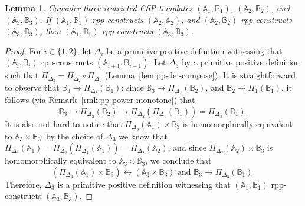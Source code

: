 \documentclass{article}
\newtheorem{lemma}[theorem]{Lemma}
\theoremstyle{definition}
\theoremstyle{remark}
\newcommand{\bA}{{\mathbb A}}
\newcommand{\bB}{{\mathbb B}}
\begin{document}
\begin{lemma}\label{lem:rpp-compose}
    Consider three restricted CSP templates $(\bA_1,\bB_1)$, $(\bA_2,\bB_2)$, 
    and $(\bA_3,\bB_3)$. If $(\bA_1,\bB_1)$ rpp-constructs $(\bA_2,\bA_2)$, 
    and $(\bA_2,\bB_2)$ rpp-constructs $(\bA_3,\bB_3)$, then $(\bA_1,\bB_1)$ 
    rpp-constructs $(\bA_3,\bB_3)$. 
\end{lemma}
\begin{proof}
    For $i\in\{1,2\}$, let $\Delta_i$ be a primitive positive definition witnessing that
    $(\bA_i,\bB_i)$ rpp-constructs $(\bA_{i+1},\bB_{i+1})$. Let $\Delta_3$ by a primitive
    positive definition such that $\Pi_{\Delta_3}=\Pi_{\Delta_2}\circ \Pi_{\Delta_1}$
    (Lemma~\ref{lem:pp-def-compose}). It is straightforward to observe that
    $\bB_3\to \Pi_{\Delta_3}(\bB_1)$:
    since  $\bB_3\to \Pi_{\Delta_2}(\bB_2)$, and $\bB_2\to \Pi_1(\bB_1)$, it follows (via
    Remark~\ref{rmk:pp-power-monotone}) that
    \[
        \bB_3\to \Pi_{\Delta_2}(\bB_2) \to \Pi_{\Delta_2}(\Pi_{\Delta_1}(\bB_1)) = \Pi_{\Delta_3}(\bB_1).
    \]
    It is also not hard to notice that $\Pi_{\Delta_3}(\bA_1)\times \bB_3$ is homomorphically equivalent to
    $\bA_3\times \bB_3$: by the choice of $\Delta_3$ we know that
    $\Pi_{\Delta_3}(\bA_1) = \Pi_{\Delta_2}(\Pi_{\Delta_1}(\bA_1)) = \Pi_{\Delta_2}(\bA_2)$, and since
    $\Pi_{\Delta_2}(\bA_2)\times \bB_3$ is homomorphically equivalent to $\bA_3\times \bB_3$, we
     conclude that
     \[
        (\Pi_{\Delta_3}(\bA_1) \times \bB_3) \leftrightarrow  (\bA_3 \times \bB_3) \text{ and } \bB_3\to \Pi_{\Delta_3}(\bB_1).
    \]
    Therefore, $\Delta_3$ is a primitive positive definition witnessing that
    $(\bA_1,\bB_1)$ rpp-constructs $(\bA_3,\bB_3)$.
\end{proof}

 
\end{document}
